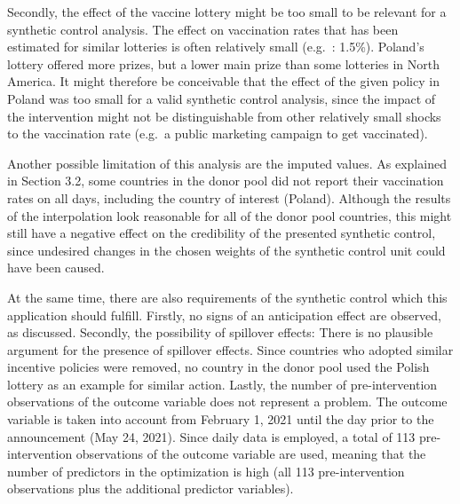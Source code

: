 \documentclass{scrbook}
\begin{document}
Secondly, the effect of the vaccine lottery might be too small to be
relevant for a synthetic control analysis. The effect on vaccination
rates that has been estimated for similar lotteries is often relatively
small (e.g.~\textcite{barber_conditional_2022}: 1.5\%). Poland's lottery
offered more prizes, but a lower main prize than some lotteries in North
America. It might therefore be conceivable that the effect of the given
policy in Poland was too small for a valid synthetic control analysis,
since the impact of the intervention might not be distinguishable from
other relatively small shocks to the vaccination rate (e.g.~a public
marketing campaign to get vaccinated).

Another possible limitation of this analysis are the imputed values. As
explained in Section 3.2, some countries in the donor pool did not
report their vaccination rates on all days, including the country of
interest (Poland). Although the results of the interpolation look
reasonable for all of the donor pool countries, this might still have a
negative effect on the credibility of the presented synthetic control,
since undesired changes in the chosen weights of the synthetic control
unit could have been caused.

At the same time, there are also requirements of the synthetic control
which this application should fulfill. Firstly, no signs of an
anticipation effect are observed, as discussed. Secondly, the
possibility of spillover effects: There is no plausible argument for the
presence of spillover effects. Since countries who adopted similar
incentive policies were removed, no country in the donor pool used the
Polish lottery as an example for similar action. Lastly, the number of
pre-intervention observations of the outcome variable does not represent
a problem. The outcome variable is taken into account from February 1,
2021 until the day prior to the announcement (May 24, 2021). Since daily
data is employed, a total of 113 pre-intervention observations of the
outcome variable are used, meaning that the number of predictors in the
optimization is high (all 113 pre-intervention observations plus the
additional predictor variables).
\end{document}
